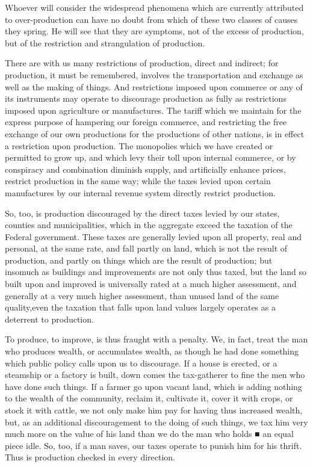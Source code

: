 \documentclass{book}
\begin{document}
Whoever will consider the widespread phenomena which are currently attributed to over-production can have no doubt from which of these two classes of causes they spring. He will see that they are symptoms, not of the excess of production, but of the restriction and strangulation of production.

There are with us many restrictions of production, direct and indirect; for production, it must be remembered, involves the transportation and exchange as well as the making of things. And restrictions imposed upon commerce or any of its instruments may operate to discourage production as fully as restrictions imposed upon agriculture or manufactures. The tariff which we maintain for the express purpose of hampering our foreign commerce, and restricting the free exchange of our own productions for the productions of other nations, is in effect a restriction upon production. The monopolies which we have created or permitted to grow up, and which levy their toll upon internal commerce, or by conspiracy and combination diminish supply, and artificially enhance prices, restrict production in the same way; while the taxes levied upon certain manufactures by our internal revenue system directly restrict production.\footnotemark[1]

So, too, is production discouraged by the direct taxes levied by our states, counties and municipalities, which in the aggregate exceed the taxation of the Federal government. These taxes are generally levied upon all property, real and personal, at the same rate, and fall partly on land, which is not the result of production, and partly on things which are the result of production; but insomuch as buildings and improvements are not only thus taxed, but the land so built upon and improved is universally rated at a much higher assessment, and generally at a very much higher assessment, than unused land of the same quality,\footnotemark[2] even the taxation that falls upon land values largely operates as a deterrent to production.

To produce, to improve, is thus fraught with a penalty. We, in fact, treat the man who produces wealth, or accumulates wealth, as though he had done something which public policy calls upon us to discourage. If a house is erected, or a steamship or a factory is built, down comes the tax-gatherer to fine the men who have done such things. If a farmer go upon vacant land, which is adding nothing to the wealth of the community, reclaim it, cultivate it, cover it with crops, or stock it with cattle, we not only make him pay for having thus increased wealth, but, as an additional discouragement to the doing of such things, we tax him very much more on the value of his land than we do the man who holds ■ an equal piece idle. So, too, if a man saves, our taxes operate to punish him for his thrift. Thus is production checked in every direction.
\end{document}
